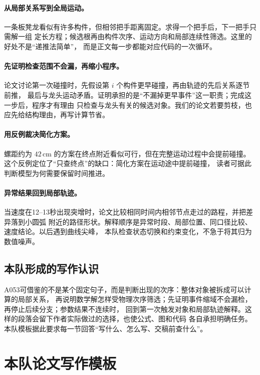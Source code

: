 \documentclass[UTF8,zihao=-4]{ctexart}
\begin{document}
\paragraph{从局部关系写到全局运动。}
一条板凳龙看似有许多构件，但相邻把手距离固定。求得一个把手后，下一把手只需解一组
定长方程；候选根再由构件次序、运动方向和局部连续性筛选。这里的好处不是“递推法简单”，
而是正文每一步都能对应代码的一次循环。

\paragraph{先证明检查范围不会漏，再缩小程序。}
论文讨论第一次碰撞时，先假设第 $i$ 个构件更早碰撞，再由轨迹的先后关系逐节前推，
最后与龙头运动矛盾。证明承担的是“不漏掉更早事件”这一职责；完成这一步后，程序才有理由
只检查与龙头有关的候选对象。我们的论文若要剪枝，也应先给结构理由，再写计算节省。

\paragraph{用反例裁决简化方案。}
螺距约为 $42\,\mathrm{cm}$ 的方案在终点附近看似可行，但在完整运动过程中会提前碰撞。
这个反例定位了“只查终点”的缺口：简化方案在运动途中提前碰撞，
读者可据此判断模型为何需要保留时间推进。

\paragraph{异常结果回到局部轨迹。}
当速度在12--13秒出现突增时，论文比较相同时间内相邻节点走过的路程，并把差异落到小圆弧
附近的路径形状。解释顺序是异常时段、局部位置、同口径比较、速度结论。以后遇到曲线尖峰，
本队检查状态切换和约束变化，不急于将其归为数值噪声。

\subsection{本队形成的写作认识}

A053可借鉴的不是某个固定句子，而是判断出现的次序：整体对象被拆成可以计算的局部关系，
再说明数学解怎样受物理次序筛选；先证明事件缩域不会漏检，再停止后续分支；参数结果不连续时，
回到第一次触发对象和局部轨迹解释。这样的段落会留下作者实际做过的选择，也使公式、图和代码
各自承担明确任务。本队模板据此要求每一节回答“写什么、怎么写、交稿前查什么”。

\section{本队论文写作模板}
\end{document}
